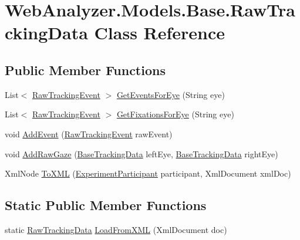 \hypertarget{class_web_analyzer_1_1_models_1_1_base_1_1_raw_tracking_data}{}\section{Web\+Analyzer.\+Models.\+Base.\+Raw\+Tracking\+Data Class Reference}
\label{class_web_analyzer_1_1_models_1_1_base_1_1_raw_tracking_data}
\subsection*{Public Member Functions}
\begin{DoxyCompactItemize}
\item 
List$<$ \hyperlink{class_web_analyzer_1_1_models_1_1_base_1_1_raw_tracking_event}{Raw\+Tracking\+Event} $>$ \hyperlink{class_web_analyzer_1_1_models_1_1_base_1_1_raw_tracking_data_a7b99eb9ecc19bc3dc012deecb687dc70}{Get\+Events\+For\+Eye} (String eye)
\item 
List$<$ \hyperlink{class_web_analyzer_1_1_models_1_1_base_1_1_raw_tracking_event}{Raw\+Tracking\+Event} $>$ \hyperlink{class_web_analyzer_1_1_models_1_1_base_1_1_raw_tracking_data_ab3a2654d87bb9a265b4f58ee3eddc7a5}{Get\+Fixations\+For\+Eye} (String eye)
\item 
void \hyperlink{class_web_analyzer_1_1_models_1_1_base_1_1_raw_tracking_data_ab923bf3a6c112dacfbfe7b81cd45cc17}{Add\+Event} (\hyperlink{class_web_analyzer_1_1_models_1_1_base_1_1_raw_tracking_event}{Raw\+Tracking\+Event} raw\+Event)
\item 
void \hyperlink{class_web_analyzer_1_1_models_1_1_base_1_1_raw_tracking_data_ad49451f7a582a47999c85666dd4ed879}{Add\+Raw\+Gaze} (\hyperlink{class_web_analyzer_1_1_models_1_1_base_1_1_base_tracking_data}{Base\+Tracking\+Data} left\+Eye, \hyperlink{class_web_analyzer_1_1_models_1_1_base_1_1_base_tracking_data}{Base\+Tracking\+Data} right\+Eye)
\item 
Xml\+Node \hyperlink{class_web_analyzer_1_1_models_1_1_base_1_1_raw_tracking_data_ae75cfde7e7b9a1e236b99c3f07f7487e}{To\+X\+M\+L} (\hyperlink{class_web_analyzer_1_1_models_1_1_base_1_1_experiment_participant}{Experiment\+Participant} participant, Xml\+Document xml\+Doc)
\end{DoxyCompactItemize}
\subsection*{Static Public Member Functions}
\begin{DoxyCompactItemize}
\item 
static \hyperlink{class_web_analyzer_1_1_models_1_1_base_1_1_raw_tracking_data}{Raw\+Tracking\+Data} \hyperlink{class_web_analyzer_1_1_models_1_1_base_1_1_raw_tracking_data_a9fb7d2281fb635efb2779dc6e502cb9e}{Load\+From\+X\+M\+L} (Xml\+Document doc)
\end{DoxyCompactItemize}
